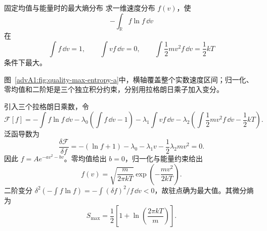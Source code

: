 \begin{advexamplebox}{固定均值与能量时的最大熵分布}\label{advA1:ex:max-entropy}
求一维速度分布 $f(v)$，使
\[
 -\int_{\mathbb R}f\ln f\,\dd v
\]
在
\[
 \int f\,\dd v=1,\qquad \int vf\,\dd v=0,\qquad
 \int\frac12mv^2f\,\dd v=\frac12kT
\]
条件下最大。

\begin{qualityfigure}
\label{advA1:fig:quality-max-entropy-q}
\end{qualityfigure}
\end{advexamplebox}
\begin{advsolution}
\begin{qualityfigure}
\label{advA1:fig:quality-max-entropy-a}
\end{qualityfigure}
图~\ref{advA1:fig:quality-max-entropy-a}中，横轴覆盖整个实数速度区间；归一化、零均值和二阶矩是三个独立积分约束，分别用拉格朗日乘子加入变分。

引入三个拉格朗日乘数，令
\[
 \mathcal F[f]=-\int f\ln f\,\dd v-\lambda_0\!\left(\int f\,\dd v-1\right)
 -\lambda_1\int vf\,\dd v
 -\lambda_2\!\left(\int\frac12mv^2f\,\dd v-\frac12kT\right).
\]
泛函导数为
\[
 \frac{\delta\mathcal F}{\delta f}
 =-(\ln f+1)-\lambda_0-\lambda_1v-\frac12\lambda_2mv^2=0.
\]
因此 $f=Ae^{-av^2-bv}$。零均值给出 $b=0$，归一化与能量约束给出
\[
 \boxed{f(v)=\sqrt{\frac{m}{2\pi kT}}
 \exp\!\left(-\frac{mv^2}{2kT}\right)}.
\]
二阶变分
$\delta^2(-\int f\ln f)=-\int(\delta f)^2/f\,\dd v<0$，故驻点确为最大值。其微分熵为
\[
 S_{\max}=\frac12\left[1+\ln\!\left(\frac{2\pi kT}{m}\right)\right].
\]
\end{advsolution}

